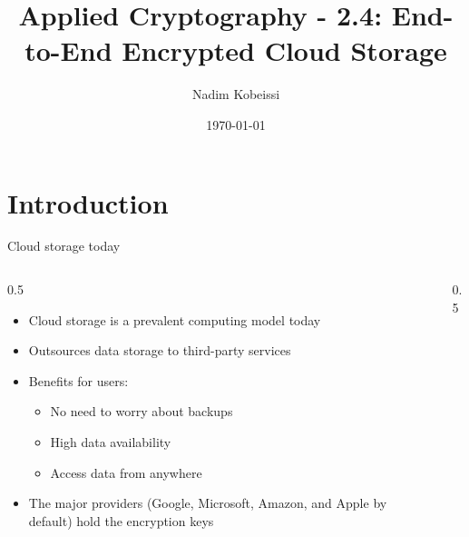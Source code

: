 \ifdefined\PRESENTATION\else\PassOptionsToClass{handout}{beamer}\fi\documentclass[aspectratio=169, lualatex]{beamer}
\title{Applied Cryptography - 2.4: End-to-End Encrypted Cloud Storage}
\author{Nadim Kobeissi}
\institute{Symbolic Software}
\date{\today}
\begin{document}
\begin{frame}[plain]
	\titlepage
\end{frame}

\section{Introduction}

\begin{frame}{Cloud storage today}
	\begin{columns}[c]
		\begin{column}{0.5\textwidth}
			\begin{itemize}
				\item Cloud storage is a prevalent computing model today
				\item Outsources data storage to third-party services
				\item Benefits for users:
				      \begin{itemize}
					      \item No need to worry about backups
					      \item High data availability
					      \item Access data from anywhere
				      \end{itemize}
				\item The major providers (Google, Microsoft, Amazon, and Apple by default) hold the encryption keys
			\end{itemize}
		\end{column}
		\begin{column}{0.5\textwidth}
		\end{column}
	\end{columns}
\end{frame}
\end{document}
